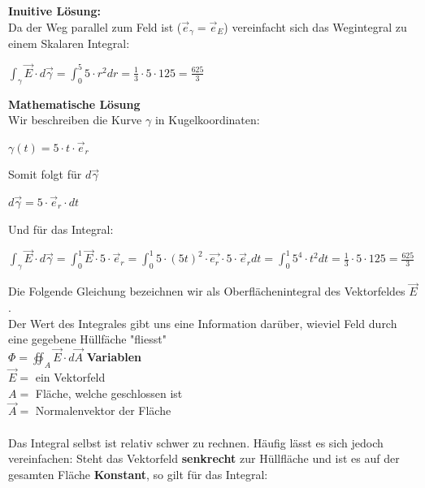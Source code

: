 \iend

\beginbsp
\textbf{Inuitive Lösung:} \\
Da der Weg parallel zum Feld ist ($\vec{e}_\gamma = \vec{e}_E$) vereinfacht sich das Wegintegral zu einem Skalaren Integral:
\begin{center}
	$\displaystyle \int_\gamma \vec{E}\cdot d\vec{\gamma} = \int_0^5 5 \cdot r^2 dr = \frac{1}{3} \cdot 5 \cdot 125 = \frac{625}{3}$
\end{center}
\textbf{Mathematische Lösung} \\
Wir beschreiben die Kurve $\gamma$ in Kugelkoordinaten:
\begin{center}
	$\gamma(t) = 5 \cdot t \cdot \vec{e}_r$
\end{center}
Somit folgt für $d \vec{\gamma}$
\begin{center}
	$d \vec{\gamma} = 5\cdot \vec{e}_r \cdot dt$
\end{center}
Und für das Integral:
\begin{center}

	$\displaystyle \int_\gamma \vec{E}\cdot d\vec{\gamma} =\int_0^1 \vec{E} \cdot 5 \cdot \vec{e}_r =  \int_0^1 5 \cdot (5t)^2 \cdot \vec{e_r} \cdot 5 \cdot \vec{e}_r dt =  \int_0^1 5^4 \cdot t^2 dt = \frac{1}{3} \cdot 5 \cdot 125 = \frac{625}{3}$
\end{center}
\iend

\newpage

\begingl
Die Folgende Gleichung bezeichnen wir als Oberflächenintegral des Vektorfeldes $\vec{E}$. \\
 Der Wert des Integrales gibt uns eine Information darüber, wieviel Feld durch eine gegebene Hüllfäche "fliesst" \\

\formulaBegin
$ \displaystyle \Phi = \oiint_A \vec{E} \cdot d\vec{A}$
\formulaEnd
\textbf{Variablen} \\
$\vec{E} =$ ein Vektorfeld\\
$A = $ Fläche, welche geschlossen ist\\
$\vec{A} =$ Normalenvektor der Fläche \\
\\

Das Integral selbst ist relativ schwer zu rechnen. Häufig lässt es sich jedoch vereinfachen:
Steht das Vektorfeld \textbf{senkrecht} zur Hüllfläche und ist es auf der gesamten Fläche \textbf{Konstant}, so gilt für das Integral: \\

